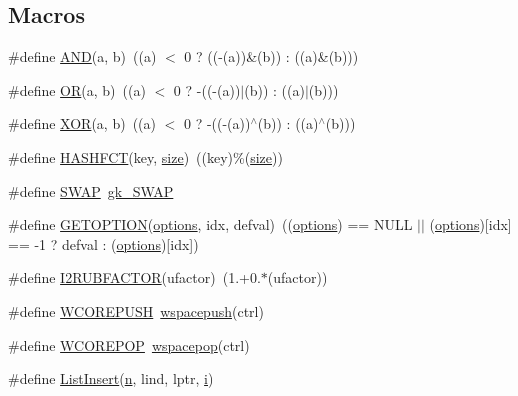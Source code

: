 \subsection*{Macros}
\begin{DoxyCompactItemize}
\item 
\#define \hyperlink{a00921_a51db6ba85772031b0a49ab3b1e46fc87}{A\+ND}(a,  b)~((a) $<$ 0 ? ((-\/(a))\&(b)) \+: ((a)\&(b)))
\item 
\#define \hyperlink{a00921_af69441c33563ebe0eb0312939509bba3}{OR}(a,  b)~((a) $<$ 0 ? -\/((-\/(a))$\vert$(b)) \+: ((a)$\vert$(b)))
\item 
\#define \hyperlink{a00921_af68c93838d750937b129e406f849ed94}{X\+OR}(a,  b)~((a) $<$ 0 ? -\/((-\/(a))$^\wedge$(b)) \+: ((a)$^\wedge$(b)))
\item 
\#define \hyperlink{a00921_aad4ca8af06a4e7cde40c07e0d3f0e17a}{H\+A\+S\+H\+F\+CT}(key,  \hyperlink{a00611_ad6cb0afbbe6ea4f56407890be2533966}{size})~((key)\%(\hyperlink{a00611_ad6cb0afbbe6ea4f56407890be2533966}{size}))
\item 
\#define \hyperlink{a00921_aac9b57651bcead0a7564efe6460e5310}{S\+W\+AP}~\hyperlink{a00053_ab9902a1b34cd7bb990d209a8235d8ebe}{gk\+\_\+\+S\+W\+AP}
\item 
\#define \hyperlink{a00921_a7550df12074e23200e7b7e42b39108ba}{G\+E\+T\+O\+P\+T\+I\+ON}(\hyperlink{a00879_a68c032ed4161802775c6847d4cb39adf}{options},  idx,  defval)~((\hyperlink{a00879_a68c032ed4161802775c6847d4cb39adf}{options}) == N\+U\+LL $\vert$$\vert$ (\hyperlink{a00879_a68c032ed4161802775c6847d4cb39adf}{options})\mbox{[}idx\mbox{]} == -\/1 ? defval \+: (\hyperlink{a00879_a68c032ed4161802775c6847d4cb39adf}{options})\mbox{[}idx\mbox{]})
\item 
\#define \hyperlink{a00921_aadb39d34d0d98e7fca3f188f6b75df20}{I2\+R\+U\+B\+F\+A\+C\+T\+OR}(ufactor)~(1.+0.$\ast$(ufactor))
\item 
\#define \hyperlink{a00921_a76445c109da4a1f7bdf538f71922446b}{W\+C\+O\+R\+E\+P\+U\+SH}~\hyperlink{a00981_a90d838f5af71d196b117d443432e4646}{wspacepush}(ctrl)
\item 
\#define \hyperlink{a00921_a213331e15c4859c51ae85a9f45dc4403}{W\+C\+O\+R\+E\+P\+OP}~\hyperlink{a00981_ad26c08175b8b18d7dfb86f2f8d91b09e}{wspacepop}(ctrl)
\item 
\#define \hyperlink{a00921_ae8effdd57854ec8ad785c63c5d71b962}{List\+Insert}(\hyperlink{a00623_a781a04ab095280f838ff3eb0e51312e0}{n},  lind,  lptr,  \hyperlink{a00608_afb6aca53df96564f2adf086c942453ec}{i})
\item 
$$
\end{DoxyCompactItemize}
